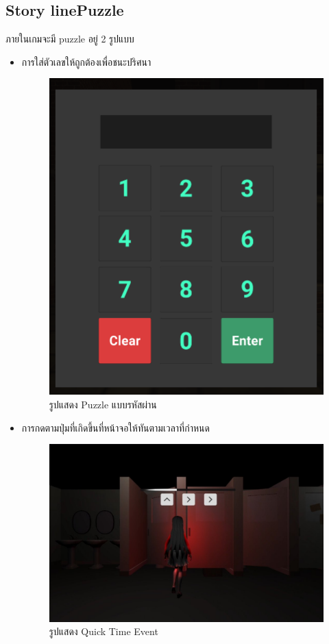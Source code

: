 \subsection{\ifenglish Story line\else Puzzle\fi }
ภายในเกมจะมี puzzle อยู่ 2 รูปแบบ
\begin{itemize}
    \item การใส่ตัวเลขให้ถูกต้องเพื่อชนะปริศนา
    \begin{figure}[h]
        \centering
        \includegraphics[scale=0.5]{Images/Password Image.png}
        \caption{รูปแสดง Puzzle แบบรหัสผ่าน}
    \end{figure}
    \item การกดตามปุ่มที่เกิดขึ้นที่หน้าจอให้ทันตามเวลาที่กำหนด
    \begin{figure}[h]
        \centering
        \includegraphics[scale=0.15]{Images/tutorial_qte.png}
        \caption{รูปแสดง Quick Time Event}
    \end{figure}
\end{itemize}
